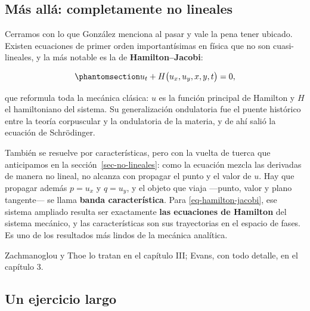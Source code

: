 \documentclass[
  spanish,
  a4paper,
]{scrbook}
\theoremstyle{definition}
\theoremstyle{plain}
\theoremstyle{definition}
\theoremstyle{plain}
\theoremstyle{definition}
\theoremstyle{remark}
\begin{document}
\subsection{Más allá: completamente no
lineales}\label{sec-no-lineales-1}

Cerramos con lo que González menciona al pasar y vale la pena tener
ubicado. Existen ecuaciones de primer orden importantísimas en física
que no son cuasi-lineales, y la más notable es la de
\textbf{Hamilton--Jacobi}:

\begin{equation}\protect\phantomsection\label{eq-hamilton-jacobi}{
u_t + H\big(u_x, u_y, x, y, t\big) = 0 ,
}\end{equation}

que reformula toda la mecánica clásica: \(u\) es la función principal de
Hamilton y \(H\) el hamiltoniano del sistema. Su generalización
ondulatoria fue el puente histórico entre la teoría corpuscular y la
ondulatoria de la materia, y de ahí salió la ecuación de Schrödinger.

También se resuelve por características, pero con la vuelta de tuerca
que anticipamos en la sección~\ref{sec-no-lineales}: como la ecuación
mezcla las derivadas de manera no lineal, no alcanza con propagar el
punto y el valor de \(u\). Hay que propagar además \(p = u_x\) y
\(q = u_y\), y el objeto que viaja ---punto, valor y plano tangente---
se llama \textbf{banda característica}. Para \ref{eq-hamilton-jacobi},
ese sistema ampliado resulta ser exactamente \textbf{las ecuaciones de
Hamilton} del sistema mecánico, y las características son sus
trayectorias en el espacio de fases. Es uno de los resultados más lindos
de la mecánica analítica.

Zachmanoglou y Thoe lo tratan en el capítulo III; Evans, con todo
detalle, en el capítulo 3.

\subsection*{Un ejercicio largo}\label{un-ejercicio-largo-1}
\end{document}
